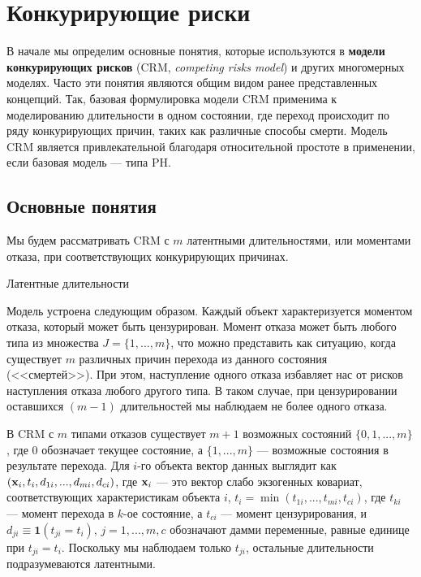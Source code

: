 \section{Конкурирующие риски}\label{sec:19.2}

\noindent
В начале мы определим основные понятия, которые используются в \textbf{модели конкурирующих рисков} (CRM, \textit{competing risks model}) и других многомерных моделях. Часто эти понятия являются общим видом ранее представленных концепций.  Так, базовая формулировка модели CRM применима к моделированию длительности в одном состоянии, где переход происходит по ряду конкурирующих причин, таких как различные способы смерти. Модель CRM является привлекательной благодаря относительной простоте в применении, если базовая модель --- типа PH.


\subsection{Основные понятия}\label{sec:19.2.1}

\noindent
Мы будем рассматривать CRM с $m$ латентными длительностями, или моментами отказа, при соответствующих конкурирующих причинах.

        \begin{center}Латентные длительности\end{center}
        \noindent
Модель устроена следующим образом. Каждый объект характеризуется моментом отказа, который может быть цензурирован. Момент отказа может быть любого типа из множества $J = \{1, ..., m\}$, что можно представить как ситуацию, когда существует $m$ различных причин перехода из данного состояния (<<смертей>>). При этом, наступление одного отказа избавляет нас от рисков наступления отказа любого другого типа. В таком случае, при цензурировании оставшихся $(m-1)$ длительностей мы наблюдаем не более одного отказа.

В CRM с $m$ типами отказов существует $m + 1$ возможных состояний $\{0, 1, ..., m\}$, где 0 обозначает текущее состояние, а $\{1, ..., m\}$ --- возможные состояния в результате перехода. Для $i$-го объекта вектор данных выглядит как $(\mathbf{x}_i, t_i, d_{1i}, ..., d_{mi}, d_{ci})$, где $\mathbf{x}_i$ --- это вектор слабо экзогенных ковариат, соответствующих характеристикам объекта $i$, $t_i = \min(t_{1i}, ..., t_{mi}, t_{ci})$, где $t_{ki}$ --- момент перехода в $k$-ое состояние, а $t_{ci}$ --- момент цензурирования, и $d_{ji} \equiv \textbf{1}(t_{ji} = t_i)$, $j = 1, ..., m, c$ обозначают дамми переменные, равные единице при $t_{ji} = t_i$. Поскольку мы наблюдаем только $t_{ji}$, остальные длительности подразумеваются латентными.

